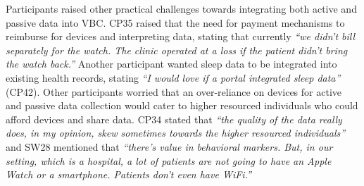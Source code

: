 Participants raised other practical challenges towards integrating both active and passive data into VBC.
CP35 raised that the need for payment mechanisms to reimburse for devices and interpreting data, stating that currently \textit{``we didn't bill separately for the watch. The clinic operated at a loss if the patient didn't bring the watch back.''}
Another participant wanted sleep data to be integrated into existing health records, stating \textit{``I would love if a portal integrated sleep data''} (CP42).
Other participants worried that an over-reliance on devices for active and passive data collection would cater to higher resourced individuals who could afford devices and share data.
CP34 stated that \textit{``the quality of the data really does, in my opinion, skew sometimes towards the higher resourced individuals''} and SW28 mentioned that \textit{``there's value in behavioral markers. But, in our setting, which is a hospital, a lot of patients are not going to have an Apple Watch or a smartphone. Patients don't even have WiFi.''}

